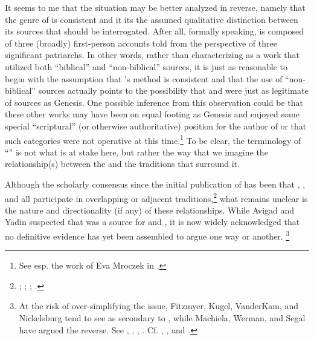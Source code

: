 It seems to me that the situation may be better analyzed in reverse, namely that the genre of \ga is consistent and it its the assumed qualitative distinction between its sources that should be interrogated. After all, formally speaking, \ga is composed of three (broadly) first-person accounts told from the perspective of three significant patriarchs. In other words, rather than characterizing \ga as a work that utilized both ``biblical'' and ``non-biblical'' sources, it is just as reasonable to begin with the assumption that \ga's method is consistent and that the use of ``non-biblical'' sources actually points to the possibility that \jub and \firstenoch were just as legitimate of sources as Genesis. One possible inference from this observation could be that these other works may have been on equal footing as Genesis and enjoyed some special ``scriptural'' (or otherwise authoritative) position for the author of \ga or that such categories were not operative at this time.\footnote{See esp. the work of Eva Mroczek in \cite*[114--155]{mroczek2016}.} To be clear, the terminology of ``\rwb'' is not what is at stake here, but rather the way that we imagine the relationship(s) between the \ga and the traditions that surround it.

Although the scholarly consensus since the initial publication of \ga has been that \firstenoch, \jub, and \ga all participate in overlapping or adjacent traditions,\footnote{\cite[38]{avigad-yadin1956}; \cite[20--22]{fitzmyer2004}; \cite[110--116]{crawford2008}; \cite[8--19]{machiela2009}.} what remains unclear is the nature and directionality (if any) of these relationships. While Avigad and Yadin suspected that \ga was a source for \firstenoch and \jub,\autocite[38]{avigad-yadin1956} it is now widely acknowledged that no definitive evidence has yet been assembled to argue one way or another.%
%
\footnote{At the risk of over-simplifying the issue, Fitzmyer, Kugel, VanderKam, and Nickelsburg tend to see \ga as secondary to \jub, while Machiela, Werman, and Segal have argued the reverse.
See \cite{vanderkam_feldman-etal2017}, \cite[20--22]{fitzmyer2004}, \cite[174]{nickelsburg2005}, \cite[305--342]{kugel2012}. Cf. \cite{segal_as2010}, \cite[140--142]{machiela2009}, and \cite[171--177]{werman_chazon-etal1999}.}

